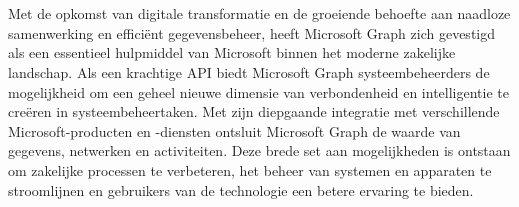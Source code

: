 
\chapter{}%
\label{ch:inleiding}

\begin{comment}
De inleiding moet de lezer net genoeg informatie verschaffen om het onderwerp te begrijpen en in te zien waarom de onderzoeksvraag de moeite waard is om te onderzoeken. In de inleiding ga je literatuurverwijzingen beperken, zodat de tekst vlot leesbaar blijft. Je kan de inleiding verder onderverdelen in secties als dit de tekst verduidelijkt. Zaken die aan bod kunnen komen in de inleiding~\autocite{Pollefliet2011}:

\begin{itemize}
  \item context, achtergrond => OK?
  \item afbakenen van het onderwerp => OK?
  \item verantwoording van het onderwerp, methodologie !!!
  \item probleemstelling !!!
  \item onderzoeksdoelstelling: !!! TODO !!!
  \item onderzoeksvraag: Is Microsoft Graph op dit moment klaar om de beheertaken die mogelijk waren met Azure AD graph over te nemen?
  \item \ldots 
\end{itemize}
\end{comment}

Met de opkomst van digitale transformatie en de groeiende behoefte aan naadloze samenwerking en efficiënt gegevensbeheer, heeft Microsoft Graph zich gevestigd als een essentieel hulpmiddel van Microsoft binnen het moderne zakelijke landschap. Als een krachtige \Ac{API} biedt Microsoft Graph systeembeheerders de mogelijkheid om een geheel nieuwe dimensie van verbondenheid en intelligentie te creëren in systeembeheertaken. Met zijn diepgaande integratie met verschillende Microsoft-producten en -diensten ontsluit Microsoft Graph de waarde van gegevens, netwerken en activiteiten. Deze brede set aan mogelijkheden is ontstaan om zakelijke processen te verbeteren, het beheer van systemen en apparaten te stroomlijnen en gebruikers van de technologie een betere ervaring te bieden. \\ 

